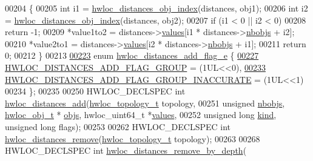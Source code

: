 \begin{DoxyCode}
00204 \{
00205   \textcolor{keywordtype}{int} i1 = \hyperlink{a00209_gab9e770c7d56c5d6040f26bd1dc8854cd}{hwloc\_distances\_obj\_index}(distances, obj1);
00206   \textcolor{keywordtype}{int} i2 = \hyperlink{a00209_gab9e770c7d56c5d6040f26bd1dc8854cd}{hwloc\_distances\_obj\_index}(distances, obj2);
00207   \textcolor{keywordflow}{if} (i1 < 0 || i2 < 0)
00208     \textcolor{keywordflow}{return} -1;
00209   *value1to2 = distances->\hyperlink{a00310_ae43e19b2c743de05c93d71a30beaca75}{values}[i1 * distances->\hyperlink{a00310_a4ca2af858cebbce7324ec49903d09474}{nbobjs} + i2];
00210   *value2to1 = distances->\hyperlink{a00310_ae43e19b2c743de05c93d71a30beaca75}{values}[i2 * distances->\hyperlink{a00310_a4ca2af858cebbce7324ec49903d09474}{nbobjs} + i1];
00211   \textcolor{keywordflow}{return} 0;
00212 \}
00213 
\hyperlink{a00210_ga22428b6bab271411e3834e6b4ca22e37}{00223} \textcolor{keyword}{enum} \hyperlink{a00210_ga22428b6bab271411e3834e6b4ca22e37}{hwloc\_distances\_add\_flag\_e} \{
\hyperlink{a00210_gga22428b6bab271411e3834e6b4ca22e37a7f6baba797d70538d03c9d13052c62ab}{00227}   \hyperlink{a00210_gga22428b6bab271411e3834e6b4ca22e37a7f6baba797d70538d03c9d13052c62ab}{HWLOC\_DISTANCES\_ADD\_FLAG\_GROUP} = (1UL<<0),
\hyperlink{a00210_gga22428b6bab271411e3834e6b4ca22e37a5233ccf631c3bc53dd5c3e7a5d5c9b77}{00233}   \hyperlink{a00210_gga22428b6bab271411e3834e6b4ca22e37a5233ccf631c3bc53dd5c3e7a5d5c9b77}{HWLOC\_DISTANCES\_ADD\_FLAG\_GROUP\_INACCURATE} = (1UL<<1)
00234 \};
00235 
00250 HWLOC\_DECLSPEC \textcolor{keywordtype}{int} \hyperlink{a00210_gac5a71d96cd86efe31d6f8d282aae3d97}{hwloc\_distances\_add}(\hyperlink{a00186_ga9d1e76ee15a7dee158b786c30b6a6e38}{hwloc\_topology\_t} topology,
00251                                        \textcolor{keywordtype}{unsigned} \hyperlink{a00310_a4ca2af858cebbce7324ec49903d09474}{nbobjs}, \hyperlink{a00238}{hwloc\_obj\_t} *
      \hyperlink{a00310_af1e78b2d628d191fa6cae3fbfe891078}{objs}, hwloc\_uint64\_t *\hyperlink{a00310_ae43e19b2c743de05c93d71a30beaca75}{values},
00252                                        \textcolor{keywordtype}{unsigned} \textcolor{keywordtype}{long} \hyperlink{a00310_aef9c83cf467da1b1fa4c36493febb3b5}{kind}, \textcolor{keywordtype}{unsigned} \textcolor{keywordtype}{long} flags);
00253 
00262 HWLOC\_DECLSPEC \textcolor{keywordtype}{int} \hyperlink{a00210_gac188d9b64d9560255ce5f6d0a20f9c0a}{hwloc\_distances\_remove}(\hyperlink{a00186_ga9d1e76ee15a7dee158b786c30b6a6e38}{hwloc\_topology\_t} topology);
00263 
00268 HWLOC\_DECLSPEC \textcolor{keywordtype}{int} \hyperlink{a00210_gaa642a4c1a21c84f38ae23fca8a27845d}{hwloc\_distances\_remove\_by\_depth}(

\end{DoxyCode}

